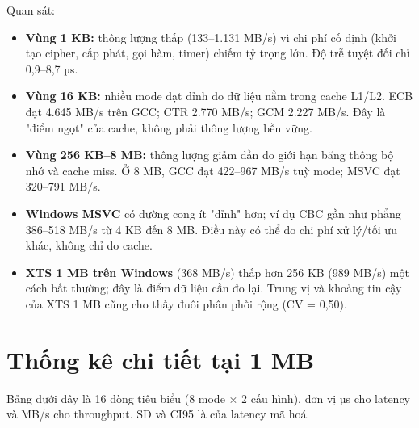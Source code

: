\documentclass[12pt,a4paper,oneside]{report}
\begin{document}
Quan sát:


\begin{itemize}[leftmargin=*]
\item \textbf{Vùng 1 KB:} thông lượng thấp (133–1.131 MB/s) vì chi phí cố định (khởi tạo cipher, cấp phát, gọi hàm, timer) chiếm tỷ trọng lớn. Độ trễ tuyệt đối chỉ 0,9–8,7 µs.
\item \textbf{Vùng 16 KB:} nhiều mode đạt đỉnh do dữ liệu nằm trong cache L1/L2. ECB đạt 4.645 MB/s trên GCC; CTR 2.770 MB/s; GCM 2.227 MB/s. Đây là "điểm ngọt" của cache, không phải thông lượng bền vững.
\item \textbf{Vùng 256 KB–8 MB:} thông lượng giảm dần do giới hạn băng thông bộ nhớ và cache miss. Ở 8 MB, GCC đạt 422–967 MB/s tuỳ mode; MSVC đạt 320–791 MB/s.
\item \textbf{Windows MSVC} có đường cong ít "đỉnh" hơn; ví dụ CBC gần như phẳng 386–518 MB/s từ 4 KB đến 8 MB. Điều này có thể do chi phí xử lý/tối ưu khác, không chỉ do cache.
\item \textbf{XTS 1 MB trên Windows} (368 MB/s) thấp hơn 256 KB (989 MB/s) một cách bất thường; đây là điểm dữ liệu cần đo lại. Trung vị và khoảng tin cậy của XTS 1 MB cũng cho thấy đuôi phân phối rộng (CV = 0,50).
\end{itemize}


\section{Thống kê chi tiết tại 1 MB}


Bảng dưới đây là 16 dòng tiêu biểu (8 mode × 2 cấu hình), đơn vị µs cho latency và MB/s cho throughput. SD và CI95 là của latency mã hoá.
\end{document}
